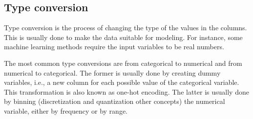 
\subsection{Type conversion}

Type conversion is the process of changing the type of the values in the columns.  This
is usually done to make the data suitable for modeling.  For instance, some machine
learning methods require the input variables to be real numbers.

The most common type conversions are from categorical to numerical and from numerical to
categorical.  The former is usually done by creating dummy variables, i.e., a new column
for each possible value of the categorical variable.  This transformation is also known as
one-hot encoding.  The latter is usually done by binning (discretization and quantization
other concepts) the numerical variable, either by
frequency or by range.


